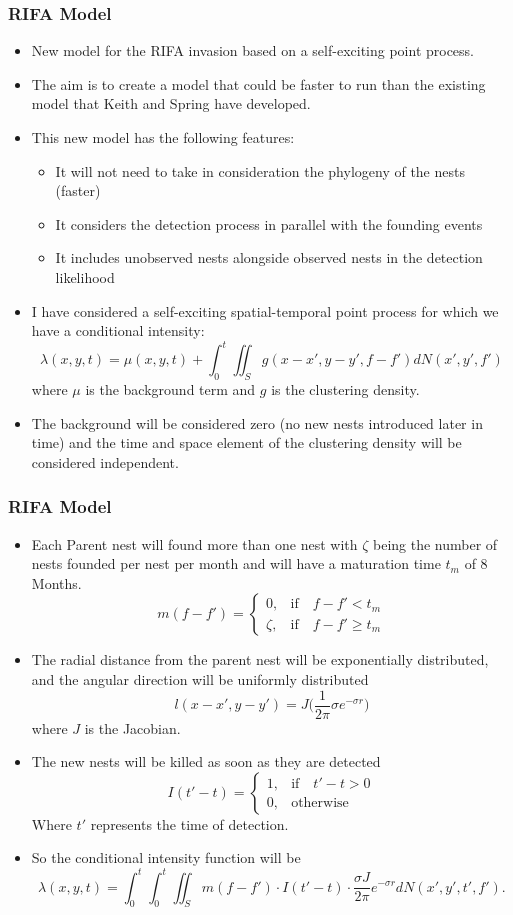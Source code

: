 \documentclass[9pt]{beamer}
\begin{document}
\begin{frame}
\frametitle{RIFA Model}
\begin{itemize}
\item New model for the RIFA invasion based on a self-exciting point process.
\item The aim is to create a model that could be faster to run than the existing model that Keith and Spring have developed.
\item This new model has the following features:
\begin{itemize}
\item It will not need to take in consideration the phylogeny of the nests (faster)
\item It considers the detection process in parallel with the founding events
\item It includes unobserved nests alongside observed nests in the detection likelihood
\end{itemize}
\item I have considered a self-exciting spatial-temporal point process for which we have a conditional intensity:
\[
\lambda(x, y, t) = \mu(x, y, t) + \int_{0}^{t} \iint_{S} g(x - x', y - y', f - f') dN(x', y', f')
\]
where $\mu$ is the background term and $g$ is the clustering density.
\item The background will be considered zero (no new nests introduced later in time) and the time and space element of the clustering density will be considered independent.
\end{itemize}
\end{frame}

\begin{frame}
\frametitle{RIFA Model}
\begin{itemize}
\item Each Parent nest will found more than one nest with $\zeta$ being the number of nests founded per nest per month and will have a maturation time $t_m$ of 8 Months.
\[
m (f - f') =
\begin{cases}
0, & \mbox{if} \quad f - f' < t_{m} \\
\zeta, & \mbox{if} \quad f - f' \geq t_{m}
\end{cases}
\]
\item The radial distance from the parent nest will be exponentially distributed, and the angular direction will be uniformly distributed 
\[
l(x - x', y - y')= J \bigg(\frac{1}{2 \pi} \sigma e^{- \sigma r}\bigg)
\]
where $J$ is the Jacobian.
\item The new nests will be killed as soon as they are detected
\[
I (t' - t) =
\begin{cases}
1, & \mbox{if} \quad t' -  t> 0 \\
0, & \mbox{otherwise}
\end{cases}
\]
Where $t'$ represents the time of detection. 
\item So the conditional intensity function will be
\[
\lambda(x, y, t) = \int_{0}^{t} \int_{0}^{t} \iint_{S} m(f - f') \cdot I(t' - t)\cdot \frac{\sigma J }{2 \pi} e^{- \sigma r} d N(x',y',t',f').
\]
\end{itemize}
\end{frame}
\end{document}
